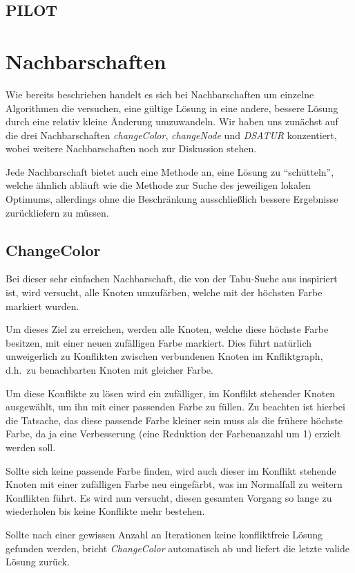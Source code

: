 \subsection{PILOT}

\section{Nachbarschaften}
\label{sec:neigh}
Wie bereits beschrieben handelt es sich bei Nachbarschaften um einzelne Algorithmen die versuchen, eine gültige Lösung in eine andere, bessere Lösung durch eine relativ kleine Änderung umzuwandeln. Wir haben uns zunächst auf die drei Nachbarschaften \emph{changeColor}, \emph{changeNode} und \emph{DSATUR} konzentiert, wobei weitere Nachbarschaften noch zur Diskussion stehen.

Jede Nachbarschaft bietet auch eine Methode an, eine Lösung zu ``schütteln'', welche ähnlich abläuft wie die Methode zur Suche des jeweiligen lokalen Optimums, allerdings ohne die Beschränkung ausschließlich bessere Ergebnisse zurückliefern zu müssen.

\subsection{ChangeColor}
\label{sec:changecolor}
Bei dieser sehr einfachen Nachbarschaft, die von der Tabu-Suche aus \citet*{Noronha2006} inspiriert ist, wird versucht, alle Knoten umzufärben, welche mit der höchsten Farbe markiert wurden. 

Um dieses Ziel zu erreichen, werden alle Knoten, welche diese höchste Farbe besitzen, mit einer neuen zufälligen Farbe markiert. Dies führt natürlich unweigerlich zu Konflikten zwischen verbundenen Knoten im Knfliktgraph, d.h.\ zu benachbarten Knoten mit gleicher Farbe. 

Um diese Konflikte zu lösen wird ein zufälliger, im Konflikt stehender Knoten ausgewählt, um ihn mit einer passenden Farbe zu füllen. Zu beachten ist hierbei die Tatsache, das diese passende Farbe kleiner sein muss als die frühere höchste Farbe, da ja eine Verbesserung (eine Reduktion der Farbenanzahl um 1) erzielt werden soll.

Sollte sich keine passende Farbe finden, wird auch dieser im Konflikt stehende Knoten mit einer zufälligen Farbe neu eingefärbt, was im Normalfall zu weitern Konflikten führt. Es wird nun versucht, diesen gesamten Vorgang so lange zu wiederholen bis keine Konflikte mehr bestehen. 

Sollte nach einer gewissen Anzahl an Iterationen keine konfliktfreie Lösung gefunden werden, bricht \emph{ChangeColor} automatisch ab und liefert die letzte valide Lösung zurück.

